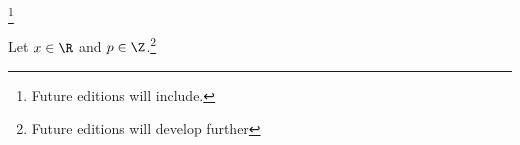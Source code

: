 
\footnote{Future editions will include.}


Let $x \in \R$ and $p \in \Z$.\footnote{Future editions will develop further}



\blankpage
